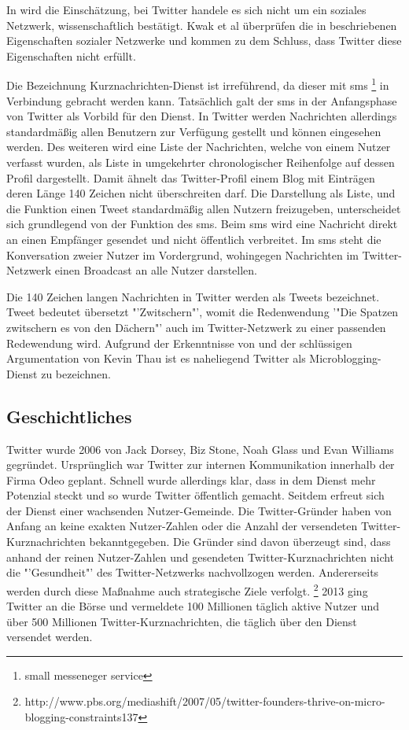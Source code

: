 			In \cite{Kwak2010} wird die Einschätzung, bei Twitter handele es sich nicht um ein soziales Netzwerk, wissenschaftlich bestätigt.
			Kwak et al überprüfen die in \cite{Newman2003} beschriebenen Eigenschaften sozialer Netzwerke und kommen zu dem Schluss, dass Twitter diese Eigenschaften nicht erfüllt.	

			Die Bezeichnung Kurznachrichten-Dienst ist irreführend, da dieser mit sms \footnote{small messeneger service} in Verbindung gebracht werden kann. 
			Tatsächlich galt der sms in der Anfangsphase von Twitter als Vorbild für den Dienst.
			In Twitter werden Nachrichten allerdings standardmäßig allen Benutzern zur Verfügung gestellt und können eingesehen werden. 
			Des weiteren wird eine Liste der Nachrichten, welche von einem Nutzer verfasst wurden, als Liste in umgekehrter chronologischer Reihenfolge auf dessen Profil dargestellt.
			Damit ähnelt das Twitter-Profil einem Blog mit Einträgen deren Länge 140 Zeichen nicht überschreiten darf. 
			Die Darstellung als Liste, und die Funktion einen Tweet standardmäßig allen Nutzern freizugeben, unterscheidet sich grundlegend von der Funktion des sms.
			Beim sms wird eine Nachricht direkt an einen Empfänger gesendet und nicht öffentlich verbreitet.
			Im sms steht die Konversation zweier Nutzer im Vordergrund, wohingegen Nachrichten im Twitter-Netzwerk einen Broadcast an alle Nutzer darstellen.

			Die 140 Zeichen langen Nachrichten in Twitter werden als Tweets bezeichnet.
			Tweet bedeutet übersetzt "'Zwitschern"', womit die Redenwendung '"Die Spatzen zwitschern es von den Dächern"' auch im Twitter-Netzwerk zu einer passenden Redewendung wird.  
			Aufgrund der Erkenntnisse von \cite{Kwak2010} und der schlüssigen Argumentation von Kevin Thau ist es naheliegend Twitter als Microblogging-Dienst zu bezeichnen.

		\subsection{Geschichtliches}
			
			Twitter wurde 2006 von Jack Dorsey, Biz Stone, Noah Glass und Evan Williams gegründet.
			Ursprünglich war Twitter zur internen Kommunikation innerhalb der Firma Odeo geplant.
			Schnell wurde allerdings klar, dass in dem Dienst mehr Potenzial steckt und so wurde Twitter öffentlich gemacht.
			Seitdem erfreut sich der Dienst einer wachsenden Nutzer-Gemeinde.
			Die Twitter-Gründer haben von Anfang an keine exakten Nutzer-Zahlen oder die Anzahl der versendeten Twitter-Kurznachrichten bekanntgegeben.
			Die Gründer sind davon überzeugt sind, dass anhand der reinen Nutzer-Zahlen und gesendeten Twitter-Kurznachrichten nicht die "'Gesundheit"' des Twitter-Netzwerks nachvollzogen werden.
			Andererseits werden durch diese Maßnahme auch strategische Ziele verfolgt.  \footnote{http://www.pbs.org/mediashift/2007/05/twitter-founders-thrive-on-micro-blogging-constraints137}
			2013 ging Twitter an die Börse und vermeldete 100 Millionen täglich aktive Nutzer und über 500 Millionen Twitter-Kurznachrichten, die täglich über den Dienst versendet werden. 

